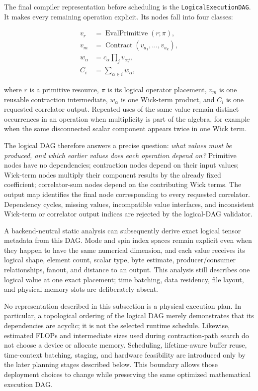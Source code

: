 \documentclass[a4paper,fleqn]{cas-dc}
\begin{document}
The final compiler representation before scheduling is the
\texttt{LogicalExecutionDAG}. It makes every remaining operation explicit. Its
nodes fall into four classes:

\begin{equation}
\begin{aligned}
v_r & = \operatorname{EvalPrimitive}(r;\pi),\\
v_m & = \operatorname{Contract}(v_{a_1},\ldots,v_{a_k}),\\
w_\alpha & = c_\alpha\prod_j v_{\alpha j},\\
C_i & = \sum_{\alpha\in i} w_\alpha,
\end{aligned}
\label{eq:logical_execution_node_classes}
\end{equation}

where \(r\) is a primitive resource, \(\pi\) is its logical operator placement,
\(v_m\) is one reusable contraction intermediate, \(w_\alpha\) is one Wick-term
product, and \(C_i\) is one requested correlator output. Repeated uses of the
same value remain distinct occurrences in an operation when multiplicity is
part of the algebra, for example when the same disconnected scalar component
appears twice in one Wick term.

The logical DAG therefore answers a precise question: \emph{what values must be
produced, and which earlier values does each operation depend on?} Primitive
nodes have no dependencies; contraction nodes depend on their input values;
Wick-term nodes multiply their component results by the already fixed
coefficient; correlator-sum nodes depend on the contributing Wick terms. The
output map identifies the final node corresponding to every requested
correlator. Dependency cycles, missing values, incompatible value interfaces,
and inconsistent Wick-term or correlator output indices are rejected by the
logical-DAG validator.

A backend-neutral static analysis can subsequently derive exact logical tensor
metadata from this DAG. Mode and spin index spaces remain explicit even when
they happen to have the same numerical dimension, and each value receives its
logical shape, element count, scalar type, byte estimate, producer/consumer
relationships, fanout, and distance to an output. This analysis still describes
one logical value at one exact placement; time batching, data residency, file
layout, and physical memory slots are deliberately absent.

No representation described in this subsection is a physical execution plan.
In particular, a topological ordering of the logical DAG merely demonstrates
that its dependencies are acyclic; it is not the selected runtime schedule.
Likewise, estimated FLOPs and intermediate sizes used during contraction-path
search do not choose a device or allocate memory. Scheduling, lifetime-aware
buffer reuse, time-context batching, staging, and hardware feasibility are
introduced only by the later planning stages described below. This boundary
allows those deployment choices to change while preserving the same optimized
mathematical execution DAG.
\end{document}
